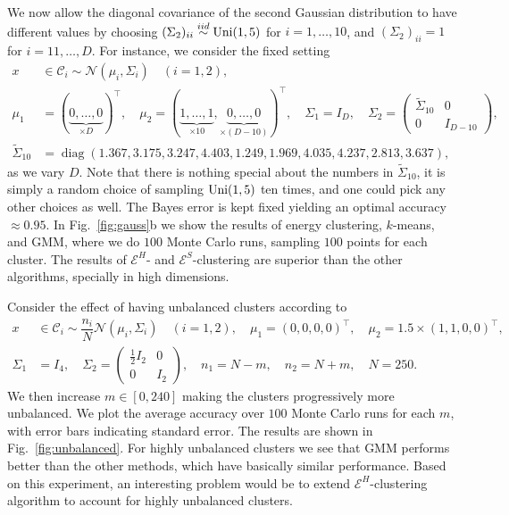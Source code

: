 \documentclass[aps,preprint,nofootinbib,floatfix]{revtex4-1}
\DeclareMathOperator{\diag}{diag}
\newcommand\C{{\mathcal{C}}}
\begin{document}
We now allow the diagonal covariance of the second Gaussian distribution to
have different values by choosing
$(\Sigma_2)_{ii} \stackrel{iid}{\sim} \textnormal{Uni}(1,5)$ for
$i=1,\dotsc,10$, and $(\Sigma_2)_{ii} = 1$ for $i=11,\dotsc,D$. For instance,
we consider the fixed setting
\begin{equation}
\label{eq:gauss2}
\begin{split}
x & \in \C_i  \sim 
\mathcal{N}(\mu_i,\Sigma_i) \quad (i=1,2),  \\
\mu_1 &= (\underbrace{0,\dotsc,0}_{\times D})^\top , \quad
\mu_2 = (\underbrace{1,\dots,1}_{\times 10},
\underbrace{0,\dots,0}_{\times (D-10)})^\top, \quad
\Sigma_1 = I_D, \quad
\Sigma_2 = \left( \begin{array}{c|c}
\widetilde{\Sigma}_{10} & 0 \\ \hline 
0 & I_{D-10} \end{array}\right), \\
\widetilde{\Sigma}_{10} &= \diag(1.367,  3.175,  3.247,  4.403,  1.249,
1.969, 4.035,   4.237,  2.813,  3.637),
\end{split}
\end{equation}
as we vary $D$. Note that there is nothing special about the numbers in
$\widetilde{\Sigma}_{10}$, it is simply a random choice of sampling
$\textnormal{Uni}(1,5)$ ten times, and one could pick any other choices
as well.
The Bayes error is kept fixed yielding
an optimal accuracy $\approx 0.95$.
In Fig.~\ref{fig:gauss}b we show the results of energy clustering,
$k$-means, and GMM, where we do $100$ Monte Carlo runs, sampling
$100$ points for each cluster. The results of $\mathcal{E}^H$-
and $\mathcal{E}^S$-clustering are superior than the other algorithms, 
specially
in high dimensions.

Consider the effect of having 
unbalanced clusters according to
\begin{equation}
\label{eq:gauss3}
\begin{split}
x &\in \C_i \sim  
\dfrac{n_i}{N} \mathcal{N}(\mu_i,\Sigma_i) \quad (i=1,2), \quad 
\mu_1 = (0,0,0,0)^\top , \quad
\mu_2 = 1.5\times (1,1,0,0)^\top, \\
\Sigma_1 &= I_4, \quad
\Sigma_2 = \left( 
\begin{array}{c|c} 
\tfrac{1}{2} I_2 & 0  \\ \hline
0 & I_2 
\end{array}\right), \quad
n_1 = N - m, \quad  n_2 = N + m, \quad N=250.
\end{split}
\end{equation}
We then increase $m \in [0,240]$ making
the clusters progressively more unbalanced.
We plot the average accuracy over
$100$ Monte Carlo runs for each $m$, with error bars indicating 
standard error. 
The results are shown in Fig.~\ref{fig:unbalanced}.
For highly unbalanced clusters we see that GMM performs better than
the other methods, which have basically similar performance.
Based on this experiment, an interesting problem would be to
extend $\mathcal{E}^H$-clustering algorithm to account for 
highly unbalanced clusters.
\end{document}
